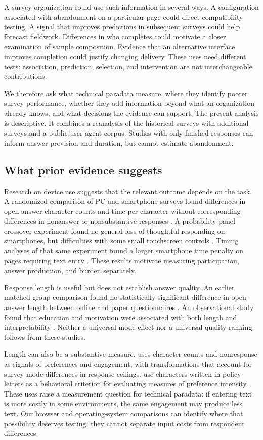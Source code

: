 \documentclass[11pt]{article}
\begin{document}
A survey organization could use such information in several ways. A configuration associated with abandonment on a particular page could direct compatibility testing. A signal that improves predictions in subsequent surveys could help forecast fieldwork. Differences in who completes could motivate a closer examination of sample composition. Evidence that an alternative interface improves completion could justify changing delivery. These uses need different tests: association, prediction, selection, and intervention are not interchangeable contributions.

We therefore ask what technical paradata measure, where they identify poorer survey performance, whether they add information beyond what an organization already knows, and what decisions the evidence can support. The present analysis is descriptive. It combines a reanalysis of the historical surveys with additional surveys and a public user-agent corpus. Studies with only finished responses can inform answer provision and duration, but cannot estimate abandonment.

\subsection{What prior evidence suggests}

Research on device use suggests that the relevant outcome depends on the task. A randomized comparison of PC and smartphone surveys found differences in open-answer character counts and time per character without corresponding differences in nonanswer or nonsubstantive responses \citep{revilla2016}. A probability-panel crossover experiment found no general loss of thoughtful responding on smartphones, but difficulties with some small touchscreen controls \citep{antoun2017}. Timing analyses of that same experiment found a larger smartphone time penalty on pages requiring text entry \citep{antoun2020}. These results motivate measuring participation, answer production, and burden separately.

Response length is useful but does not establish answer quality. An earlier matched-group comparison found no statistically significant difference in open-answer length between online and paper questionnaires \citep{denscombe2008}. An observational study found that education and motivation were associated with both length and interpretability \citep{schmidt2020}. Neither a universal mode effect nor a universal quality ranking follows from these studies.

Length can also be a substantive measure. \citet{wasow2026} uses character counts and nonresponse as signals of preferences and engagement, with transformations that account for survey-mode differences in response ceilings. \citet{cavaille2025} use characters written in policy letters as a behavioral criterion for evaluating measures of preference intensity. These uses raise a measurement question for technical paradata: if entering text is more costly in some environments, the same engagement may produce less text. Our browser and operating-system comparisons can identify where that possibility deserves testing; they cannot separate input costs from respondent differences.
\end{document}
